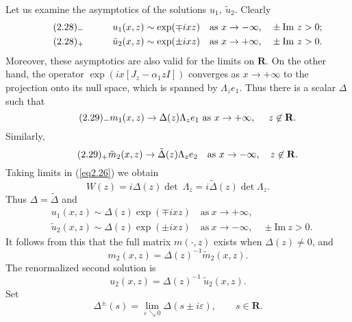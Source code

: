 \documentclass{surv-l}
\theoremstyle{plain}
\theoremstyle{definition}
\numberwithin{equation}{chapter}
\begin{document}
Let us examine the asymptotics of the solutions $u_{1},\ \tilde{u}_{2}$. Clearly
\begin{align*}\label{eq2.28-}
\tag*{$(2.28)_{-}$} \qquad \quad &u_{1}(x,z)\sim\exp(\mp ixz)&\mathrm{as}\ x\rightarrow-\infty,
&\quad\pm\mathrm{Im}\ z>0;\\\label{eq2.28+}
\tag*{$(2.28)_{+}$}  \qquad \quad &\tilde{u}_{2}(x,z)\sim\exp(\pm ixz)&\mathrm{as}\ x\rightarrow+\infty,&\quad\pm\mathrm{ Im}\ z>0.
\end{align*}
Moreover, these asymptotics are also valid for the limits on $\mathbf{R}$. On the other hand, the operator $\exp(ix[J_{z}-\alpha_{1}zI])$ converges as $ x\rightarrow+\infty$ to the projection onto its null space, which is spanned by $\Lambda_{z}e_{1}$. Thus there is a scalar $\Delta$ such that
\begin{equation*}\label{eq2.29-}
\tag*{$(2.29)_{-}$}  m_{1}(x,z)\rightarrow\Delta(z)\Lambda_{z}e_{1}\ \mathrm{as}\  x\rightarrow+\infty,\quad \ z\not\in \mathbf{R}.
\end{equation*}
Similarly,
\begin{equation*}\label{eq2.29+}
\tag*{$(2.29)_{+}$}  \tilde{m}_{2}(x, z)\rightarrow\tilde{\Delta}(z)\Lambda_{z}e_{2}\quad  \mathrm{as}\  x\rightarrow-\infty,\quad z\not\in \mathbf{R}.
\end{equation*}
Taking limits in (\ref{eq2.26}) we obtain
\setcounter{equation}{29}
\begin{equation}\label{eq2.30}
 W(z)=i\Delta(z)\det\ \Lambda_{z}=i\tilde{\Delta}(z)\det\Lambda_{z}.
\end{equation}
Thus $\Delta=\tilde{\Delta}$ and
\begin{align}\label{eq2.31}
&u_{1}(x,z)\sim\Delta(z)\exp(\mp ixz)\quad\mathrm{as}\ x\rightarrow+\infty,\\ \nonumber
&\tilde{u}_{2}(x,z)\sim\Delta(z)\exp(\pm ixz)\quad\mathrm{as}\ x\rightarrow-\infty, \quad\pm\mathrm{Im}\ z>0.
\end{align}
It follows from this that the full matrix $m(\cdot, z)$ exists when $\Delta(z)\neq 0$, and
\begin{equation}\label{eq2.32}
m_{2}(x, z)=\Delta(z)^{-1}\tilde{m}_{2}(x, z).
\end{equation}
The renormalized second solution is
\begin{equation}\label{eq2.33}
u_{2}(x, z)=\Delta(z)^{-1}\ \tilde{u}_{2}(x,z).
\end{equation}
Set
\begin{equation}\label{eq2.34}
\Delta^{\pm}(s)=\mathop\mathrm{lim}_{\varepsilon\searrow 0}\Delta(s\pm i\varepsilon),\qquad s\in \mathbf{R}.
\end{equation}
\end{document}
